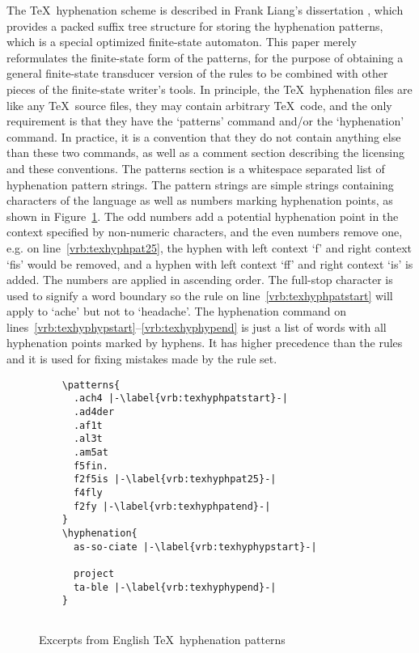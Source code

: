 \documentclass[postprint]{flammie}
\begin{document}
The \TeX\ hyphenation scheme is described in Frank Liang's
dissertation \cite{liang/1983}, which provides a packed suffix tree
structure for storing the hyphenation patterns, which is a special
optimized finite-state automaton.  This paper merely reformulates the
finite-state form of the patterns, for the purpose of obtaining a
general finite-state transducer version of the rules to be combined
with other pieces of the finite-state writer's tools.  In principle,
the \TeX\ hyphenation files are like any \TeX\ source files, they may
contain arbitrary \TeX\ code, and the only requirement is that they
have the `patterns' command and/or the `hyphenation' command. In
practice, it is a convention that they do not contain anything else
than these two commands, as well as a comment section describing the
licensing and these conventions. The patterns section is a whitespace
separated list of hyphenation pattern strings. The pattern strings are
simple strings containing characters of the language as well as
numbers marking hyphenation points, as shown in
Figure~\ref{fig:tex-hyph-example}. The odd numbers add a potential
hyphenation point in the context specified by non-numeric characters,
and the even numbers remove one, e.g. on line~\ref{vrb:texhyphpat25},
the hyphen with left context `f' and right context `fis' would be
removed, and a hyphen with left context `ff' and right context `is' is
added. The numbers are applied in ascending order.  The full-stop
character is used to signify a word boundary so the rule on
line~\ref{vrb:texhyphpatstart} will apply to `ache' but not to
`headache'. The hyphenation command on
lines~\ref{vrb:texhyphypstart}--\ref{vrb:texhyphypend} is just a list
of words with all hyphenation points marked by hyphens. It has higher
precedence than the rules and it is used for fixing mistakes made
by the rule set.

\begin{figure}[tbp]
  \centering
  \begin{lstlisting}
    \patterns{
      .ach4 |-\label{vrb:texhyphpatstart}-|
      .ad4der
      .af1t
      .al3t
      .am5at
      f5fin.
      f2f5is |-\label{vrb:texhyphpat25}-|
      f4fly
      f2fy |-\label{vrb:texhyphpatend}-|
    }
    \hyphenation{
      as-so-ciate |-\label{vrb:texhyphypstart}-|
      
      project
      ta-ble |-\label{vrb:texhyphypend}-|
    }
    
  \end{lstlisting}
  \caption{Excerpts from English \TeX\ hyphenation patterns}
  \label{fig:tex-hyph-example}
\end{figure}
\end{document}

